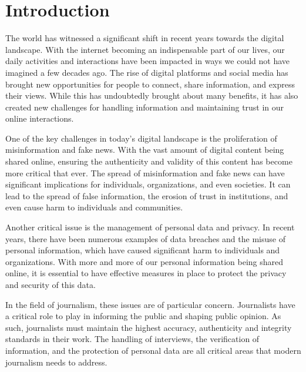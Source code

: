 \documentclass[target=mst,aauheader=]{thud}
\begin{document}
\listoftables

\listoffigures



\mainmatter

%

\chapter{Introduction}

The world has witnessed a significant shift in recent years towards the digital landscape. With the internet becoming an indispensable part of our lives, our daily activities and interactions have been impacted in ways we could not have imagined a few decades ago. The rise of digital platforms and social media has brought new opportunities for people to connect, share information, and express their views. While this has undoubtedly brought about many benefits, it has also created new challenges for handling information and maintaining trust in our online interactions.

One of the key challenges in today's digital landscape is the proliferation of misinformation and fake news. With the vast amount of digital content being shared online, ensuring the authenticity and validity of this content has become more critical that ever. The spread of misinformation and fake news can have significant implications for individuals, organizations, and even societies. It can lead to the spread of false information, the erosion of trust in institutions, and even cause harm to individuals and communities.

Another critical issue is the management of personal data and privacy. In recent years, there have been numerous examples of data breaches and the misuse of personal information, which have caused significant harm to individuals and organizations. With more and more of our personal information being shared online, it is essential to have effective measures in place to protect the privacy and security of this data.

In the field of journalism, these issues are of particular concern. Journalists have a critical role to play in informing the public and shaping public opinion. As such, journalists must maintain the highest accuracy, authenticity and integrity standards in their work. The handling of interviews, the verification of information, and the protection of personal data are all critical areas that modern journalism needs to address.
\end{document}
